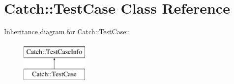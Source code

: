 \hypertarget{classCatch_1_1TestCase}{
\section{Catch::TestCase Class Reference}
\label{classCatch_1_1TestCase}
}
Inheritance diagram for Catch::TestCase::\begin{figure}[H]
\begin{center}
\leavevmode
\includegraphics[height=2cm]{classCatch_1_1TestCase}
\end{center}
\end{figure}
